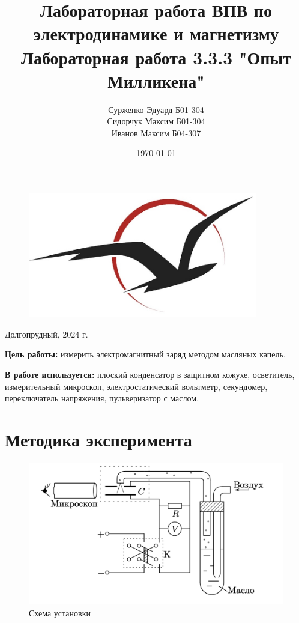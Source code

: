 \documentclass{lab}
\title {Лабораторная работа }
\author {}
\date{\today}
\begin{document}
\begin{titlepage}
	\centering
	\begin{figure}[t]
		\centering
		\includegraphics[width=100mm]{frtk-label 2.jpg}
		\label{frkt-label.jpg}
	\end{figure}

	\author{Сурженко Эдуард Б01-304 \\ Сидорчук Максим Б01-304 \\ Иванов Максим Б04-307}
	\title{ВПВ по электродинамике и магнетизму \\
		Лабораторная работа 3.3.3 "Опыт Милликена"}
	\date{}
	\maketitle
	\thispagestyle{empty}
	\vfill
	Долгопрудный, 2024 г.

\end{titlepage}
\newpage

\textbf{Цель работы:} измерить электромагнитный заряд методом масляных капель.
\par
\textbf{В работе используется:} плоский конденсатор в защитном кожухе, осветитель, измерительный микроскоп, электростатический вольтметр, секундомер, переключатель напряжения, пульверизатор с маслом.
\section{Методика эксперимента}
\begin{figure}[h!]
	\centering
	\includegraphics[width=0.8\linewidth]{Снимок экрана 2024-12-24 в 19.44.51.png}
	\caption{Схема установки}
	\label{fig:ustan}
\end{figure}
\end{document}

